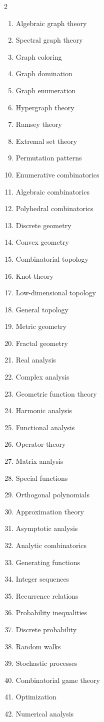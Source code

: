 \documentclass[11pt,a4paper]{article}
\numberwithin{equation}{section}
\theoremstyle{definition}
\theoremstyle{remark}
\begin{document}
\begin{multicols}{2}
\begin{enumerate}[leftmargin=2.6em,itemsep=0pt,parsep=0pt,topsep=0pt]
\item Algebraic graph theory
\item Spectral graph theory
\item Graph coloring
\item Graph domination
\item Graph enumeration
\item Hypergraph theory
\item Ramsey theory
\item Extremal set theory
\item Permutation patterns
\item Enumerative combinatorics
\item Algebraic combinatorics
\item Polyhedral combinatorics
\item Discrete geometry
\item Convex geometry
\item Combinatorial topology
\item Knot theory
\item Low-dimensional topology
\item General topology
\item Metric geometry
\item Fractal geometry
\item Real analysis
\item Complex analysis
\item Geometric function theory
\item Harmonic analysis
\item Functional analysis
\item Operator theory
\item Matrix analysis
\item Special functions
\item Orthogonal polynomials
\item Approximation theory
\item Asymptotic analysis
\item Analytic combinatorics
\item Generating functions
\item Integer sequences
\item Recurrence relations
\item Probability inequalities
\item Discrete probability
\item Random walks
\item Stochastic processes
\item Combinatorial game theory
\item Optimization
\item Numerical analysis
\end{enumerate}
\end{multicols}
\end{document}
